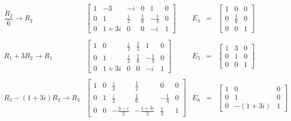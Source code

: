 \begin{enumerate}[\bfseries 1.]
$$\begin{array}{rlrcl}
	    \dfrac{R_2}{6} \to R_2&
	    \left[
		\begin{array}{rrr|rrr}
		    1 & -3 & -i &  0 & 1 & 0 \\
		    0 & 1 & \frac{i}{2} &  \frac{1}{6} & -\frac{1}{3} & 0 \\
		    0 & 1+3i & 0 &  0 & -i & 1
		\end{array}
	    \right]
	    &E_4&=&
	    \left[
		\begin{array}{rrr}
		    1&0&0\\
		    0&\frac{1}{6}&0\\
		    0&0&1
		\end{array}
	    \right]\\\\
	    R_1+3R_2\to R_1&
	    \left[
		\begin{array}{rrr|rrr}
		    1 & 0 & \frac{i}{2} &  \frac{1}{2} & 1 & 0 \\
		    0 & 1 & \frac{i}{2} &  \frac{1}{6} & -\frac{1}{3} & 0 \\
		    0 & 1+3i & 0 &  0 & -i & 1
		\end{array}
	    \right]
	    &E_5&=&
	    \left[
		\begin{array}{rrr}
		    1&3&0\\
		    0&1&0\\
		    0&0&1
		\end{array}
	    \right]\\\\
	    R_3-(1+3i)R_2\to R_3&
	    \left[
		\begin{array}{rrr|rrr}
		    1 & 0 & \frac{i}{2} &  \frac{1}{2} & 0 & 0 \\
		    0 & 1 & \frac{i}{2} &  \frac{1}{6} & -\frac{1}{3} & 0 \\
		    0 & 0 & -\frac{3-i}{2} &  -\frac{1+3i}{2} & \frac{1}{3} & 1
		\end{array}
	    \right]
	    &E_6&=&
	    \left[
		\begin{array}{rrr}
		    1&0&0\\
		    0&1&0\\
		    0&-(1+3i)&1
		\end{array}
	    \right]
	\end{array}
	$$


\end{enumerate}
